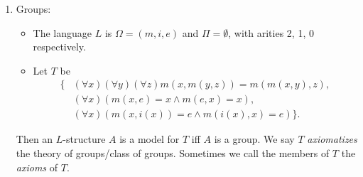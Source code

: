\documentclass[a4paper]{article}
\begin{document}
\begin{eg}\leavevmode
  \begin{enumerate}
    \item Groups:
      \begin{itemize}
        \item The language $L$ is $\Omega = (m, i, e)$ and $\Pi = \emptyset$, with arities 2, 1, 0 respectively.
        \item Let $T$ be
          \begin{align*}
            \{&(\forall x)(\forall y)(\forall z) m(x,m(y, z)) = m(m(x, y), z),\\
              &(\forall x)(m(x, e) = x \wedge m(e, x) = x),\\
            & (\forall x)(m(x, i(x)) = e \wedge m(i(x), x) = e)\}.
          \end{align*}
      \end{itemize}
      Then an $L$-structure $A$ is a model for $T$ iff $A$ is a group. We say $T$ \emph{axiomatizes} the theory of groups/class of groups. Sometimes we call the members of $T$ the \emph{axioms} of $T$.


\end{enumerate}
\end{eg}
\end{document}
